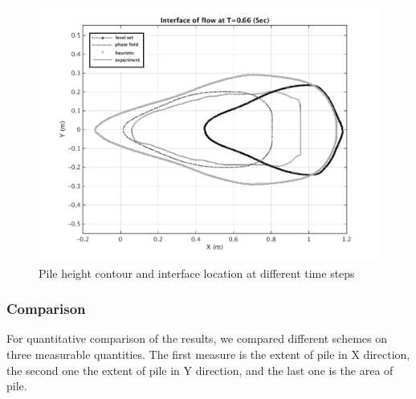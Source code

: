 \documentclass[letterpaper,10pt]{article}
\begin{document}
\begin{figure}[H]
\begin{minipage}[b]{.48 \linewidth}
    \includegraphics[width=1\textwidth]{IMAGES/interface660exp.png}
  \end{minipage}
  \caption{Pile height contour and interface location at different time steps}
  \label{odinary}
\end{figure}

\subsubsection{Comparison}

For quantitative comparison of the results, we compared different schemes on three measurable quantities. The first measure is the extent of pile in X direction, the second one the extent of pile in Y direction, and the last one is the area of pile.
\end{document}
